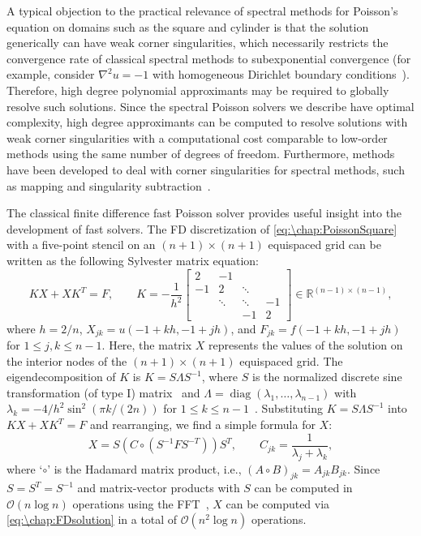 A typical objection to the practical relevance of spectral methods for Poisson's equation on domains such as the square and cylinder is that the solution generically can have weak corner singularities, which necessarily restricts the convergence rate of classical spectral methods to subexponential convergence (for example, consider $\nabla^2 u = -1$ with homogeneous Dirichlet boundary conditions~\cite[(2.39)]{Boyd_01_01}). Therefore, high degree polynomial approximants may be required to globally resolve such solutions. Since the spectral Poisson solvers we describe have optimal complexity, high degree approximants can be computed to resolve solutions with weak corner singularities with a computational cost comparable to low-order methods using the same number of degrees of freedom. Furthermore, methods have been developed to deal with corner singularities for spectral methods, such as mapping and singularity subtraction~\cite{Boyd_01_01}. %

The classical finite difference fast Poisson solver provides useful insight into the development of fast solvers. The FD discretization of \cref{eq:\chap:PoissonSquare} with a five-point stencil on an $(n+1)\times (n+1)$ equispaced grid can be written as the following Sylvester matrix equation:
\begin{equation}
KX + XK^T = F, \qquad K = -\frac{1}{h^2}\begin{bmatrix}2 & -1 \\ -1 & 2 & \ddots \\ &\ddots&\ddots &-1 \\  & & -1 & 2\end{bmatrix}\in\mathbb{R}^{(n-1)\times(n-1)},
\label{eq:\chap:FDequation}
\end{equation}
where $h = 2/n$, $X_{jk} = u(-1+kh,-1+jh)$, and $F_{jk} = f(-1+kh,-1+jh)$ for $1\leq j,k\leq n-1$. Here, the matrix $X$ represents the values of the solution on the interior nodes of the $(n+1)\times(n+1)$ equispaced grid. The eigendecomposition of $K$ is $K = S\Lambda S^{-1}$, where $S$ is the normalized discrete sine transformation (of type I) matrix~\cite[(2.24)]{LeVeque_07_01} and $\Lambda = \operatorname{diag}(\lambda_1,\ldots,\lambda_{n-1})$ with $\lambda_k = -4/h^2\sin^2(\pi k/(2n))$ for $1\leq k\leq n-1$~\cite[(2.23)]{LeVeque_07_01}. Substituting $K = S\Lambda S^{-1}$ into $KX+XK^T = F$ and rearranging, we find a simple formula for $X$:
\begin{equation}
X = S\left(C\circ (S^{-1}FS^{-T})\right)S^{T}, \qquad C_{jk} = \frac{1}{\lambda_j+\lambda_k},
\label{eq:\chap:FDsolution}
\end{equation}
where `$\circ$' is the Hadamard matrix product, i.e., $(A\circ B)_{jk} = A_{jk}B_{jk}$. Since $S = S^{T} = S^{-1}$ and matrix-vector products with $S$ can be computed in $\mathcal{O}(n\log n)$ operations using the FFT~\cite{Britanak_10_01}, $X$ can be computed via \cref{eq:\chap:FDsolution} in a total of $\mathcal{O}(n^2 \log n)$ operations.

